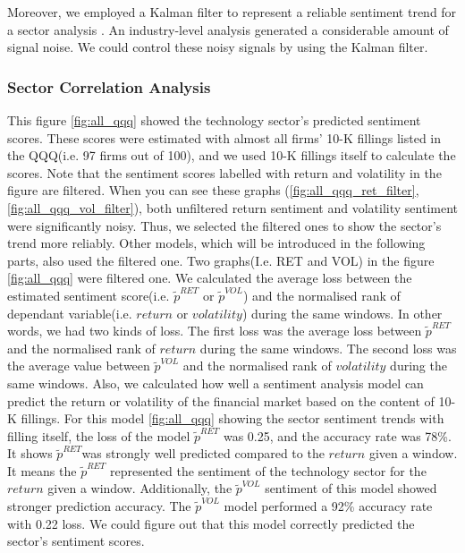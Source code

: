 \documentclass[logo,bsc,singlespacing,parskip]{infthesis}
\begin{document}
Moreover, we employed a Kalman filter to represent a reliable sentiment trend for a sector analysis \cite{durbin2012time}. An industry-level analysis generated a considerable amount of signal noise. We could control these noisy signals by using the Kalman filter.

\subsubsection{Sector Correlation Analysis}


This figure \ref{fig:all_qqq} showed the technology sector’s predicted sentiment scores. These scores were estimated with almost all firms’ 10-K fillings listed in the QQQ(i.e. 97 firms out of 100), and we used 10-K fillings itself to calculate the scores. Note that the sentiment scores labelled with return and volatility in the figure are filtered. When you can see these graphs (\ref{fig:all_qqq_ret_filter}, \ref{fig:all_qqq_vol_filter}), both unfiltered return sentiment and volatility sentiment were significantly noisy. Thus, we selected the filtered ones to show the sector’s trend more reliably. Other models, which will be introduced in the following parts, also used the filtered one. Two graphs(I.e. RET and VOL) in the figure \ref{fig:all_qqq} were filtered one. We calculated the average loss between the estimated sentiment score(i.e. $\tilde{p}^{RET}$ or $\tilde{p}^{VOL}$) and the normalised rank of dependant variable(i.e. $return$ or $volatility$) during the same windows. In other words, we had two kinds of loss. The first loss was the average loss between $\tilde{p}^{RET}$ and the normalised rank of $return$ during the same windows. The second loss was the average value between $\tilde{p}^{VOL}$ and the normalised rank of $volatility$ during the same windows. Also, we calculated how well a sentiment analysis model can predict the return or volatility of the financial market based on the content of 10-K fillings. For this model \ref{fig:all_qqq} showing the sector sentiment trends with filling itself, the loss of the model $\tilde{p}^{RET}$ was 0.25, and the accuracy rate was 78\%. It shows $\tilde{p}^{RET}$was strongly well predicted compared to the $return$ given a window. It means the $\tilde{p}^{RET}$ represented the sentiment of the technology sector for the $return$ given a window. Additionally, the $\tilde{p}^{VOL}$ sentiment of this model showed stronger prediction accuracy. The $\tilde{p}^{VOL}$ model performed a 92\% accuracy rate with 0.22 loss. We could figure out that this model correctly predicted the sector’s sentiment scores. 
\end{document}
